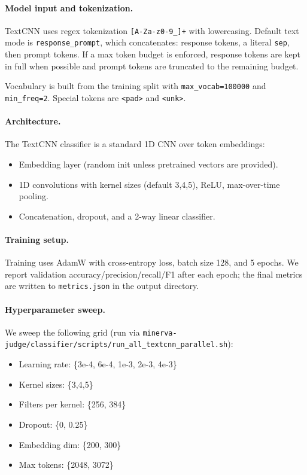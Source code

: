 \paragraph{Model input and tokenization.}
TextCNN uses regex tokenization \texttt{[A-Za-z0-9\_]+} with lowercasing.
Default text mode is \texttt{response\_prompt}, which concatenates:
response tokens, a literal \texttt{sep}, then prompt tokens. If a max token
budget is enforced, response tokens are kept in full when possible and prompt
tokens are truncated to the remaining budget.

Vocabulary is built from the training split with \texttt{max\_vocab=100000}
and \texttt{min\_freq=2}. Special tokens are \texttt{<pad>} and \texttt{<unk>}.

\paragraph{Architecture.}
The TextCNN classifier is a standard 1D CNN over token embeddings:
\begin{itemize}
  \item Embedding layer (random init unless pretrained vectors are provided).
  \item 1D convolutions with kernel sizes (default 3,4,5), ReLU, max-over-time pooling.
  \item Concatenation, dropout, and a 2-way linear classifier.
\end{itemize}

\paragraph{Training setup.}
Training uses AdamW with cross-entropy loss, batch size 128, and 5 epochs. We
report validation accuracy/precision/recall/F1 after each epoch; the final
metrics are written to \texttt{metrics.json} in the output directory.

\paragraph{Hyperparameter sweep.}
We sweep the following grid (run via
\texttt{minerva-judge/classifier/scripts/run\_all\_textcnn\_parallel.sh}):
\begin{itemize}
  \item Learning rate: \{3e-4, 6e-4, 1e-3, 2e-3, 4e-3\}
  \item Kernel sizes: \{3,4,5\}
  \item Filters per kernel: \{256, 384\}
  \item Dropout: \{0, 0.25\}
  \item Embedding dim: \{200, 300\}
  \item Max tokens: \{2048, 3072\}
\end{itemize}

